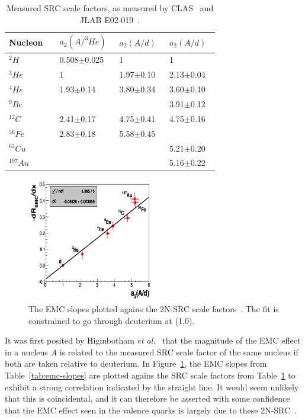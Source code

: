 \begin{table}
	\centering
	\setlength{\tabcolsep}{2em}
	\begin{tabular}{@{}lllll@{}}\toprule
		Nucleon & & $a_2(A/^3He)$~\cite{Egiyan:2005hs} & $a_2(A/d)$~\cite{PhysRevLett.106.052301} & $a_2(A/d)$~\cite{Fomin:2011ng} \\ \midrule	
		$^2H$ & & 	0.508$\pm$0.025		 & 1	  					  	 &  1 \\
		$^3He$ & & 1 								 & 1.97$\pm$0.10		& 2.13$\pm$0.04 \\
		$^4He$ & & 1.93$\pm$0.14			& 3.80$\pm$0.34      &  3.60$\pm$0.10 \\
		$^9Be$ & & 		 							  & 							  & 3.91$\pm$0.12 \\
		$^{12}C$ & & 2.41$\pm$0.17			& 4.75$\pm$0.41		  & 4.75$\pm$0.16  \\
		$^{56}Fe$ & & 2.83$\pm$0.18		   & 5.58$\pm$0.45		&  \\
  	    $^{63}Cu$ & & 								& 								& 5.21$\pm$0.20 \\
		$^{197}Au$ & & 								& 							    & 5.16$\pm$0.22 \\ \bottomrule		
	\end{tabular}
	\caption{Measured SRC scale factors, as measured by CLAS~\cite{Egiyan:2005hs} and JLAB E02-019~\cite{PhysRevLett.106.052301, Fomin:2011ng}.}
	\label{tab:a2-src}
\end{table}

\begin{figure}
	\centering
	\includegraphics[width=0.5\textwidth]{figures/background/emc-a2.png}
	\caption{The EMC slopes plotted agains the 2N-SRC scale factors~\cite{Hen:2012fm}. The fit is constrained to go through deuterium at (1,0).}
	\label{fig:emc-a2}
\end{figure}
It was first posited by Higinbotham \emph{et al.}~\cite{Higinbotham:2010ye} that the magnitude of the EMC effect in a nucleus $A$ is related to the measured SRC scale factor of the same nucleus if both are taken relative to deuterium. In Figure~\ref{fig:emc-a2}, the EMC slopes from Table~\ref{tab:emc-slopes} are plotted agains the SRC scale factors from Table~\ref{tab:a2-src} to exhibit a strong correlation indicated by the straight line. It would seem unlikely that this is coincidental, and it can therefore be asserted with some confidence that the EMC effect seen in the valence quarks is largely due to these 2N-SRC~\cite{Rith:2014tma}.

